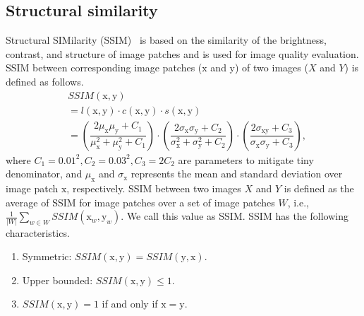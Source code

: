 \subsection{Structural similarity}
Structural SIMilarity (SSIM)~\cite{wang2004ssim,hore2010psnr_ssim} is based on the similarity of the brightness, contrast, and structure of image patches and is used for image quality evaluation.
SSIM between corresponding image patches ($\bm{\mathrm{x}}$ and $\bm{\mathrm{y}}$) of two images ($X$ and $Y$) is defined as follows.
\begin{align}
    & SSIM(\bm{\mathrm{x}}, \bm{\mathrm{y}}) \\
    & = l(\bm{\mathrm{x}}, \bm{\mathrm{y}})\cdot c(\bm{\mathrm{x}}, \bm{\mathrm{y}}) \cdot s(\bm{\mathrm{x}}, \bm{\mathrm{y}}) \\
    & = \left(\dfrac{2\mu_{\bm{\mathrm{x}}}\mu_{\bm{\mathrm{y}}}+C_1}{\mu_{\bm{\mathrm{x}}}^2+\mu_{\bm{\mathrm{y}}}^2+C_1}\right)\cdot \left(\dfrac{2\sigma_{\bm{\mathrm{x}}}\sigma_{\bm{\mathrm{y}}} + C_2}{\sigma_{\bm{\mathrm{x}}}^2+\sigma_{\bm{\mathrm{y}}}^2+C_2}\right) \cdot \left(\dfrac{2\sigma_{\bm{\mathrm{x}}\bm{\mathrm{y}}}+C_3}{\sigma_{\bm{\mathrm{x}}}\sigma_{\bm{\mathrm{y}}}+C_3}\right),
\end{align}
where $C_1=0.01^2, C_2=0.03^2, C_3=2C_2$ are parameters to mitigate tiny denominator, and $\mu_{\bm{\mathrm{x}}}$ and $\sigma_{\bm{\mathrm{x}}}$ represents the mean and standard deviation over image patch $\bm{\mathrm{x}}$, respectively.
SSIM between two images $X$ and $Y$ is defined as the average of SSIM for image patches over a set of image patches $W$, i.e., $\frac{1}{|W|}\sum_{w\in W}SSIM(\bm{\mathrm{x}}_w, \bm{\mathrm{y}}_w)$. We call this value as SSIM.
SSIM has the following characteristics.
\begin{enumerate}
    \item Symmetric: $SSIM(\bm{\mathrm{x}}, \bm{\mathrm{y}})=SSIM(\bm{\mathrm{y}}, \bm{\mathrm{x}})$.
    \item Upper bounded: $SSIM(\bm{\mathrm{x}}, \bm{\mathrm{y}})\leq 1$.
    \item $SSIM(\bm{\mathrm{x}}, \bm{\mathrm{y}})=1$ if and only if $\bm{\mathrm{x}} = \bm{\mathrm{y}}$.
\end{enumerate}
